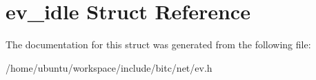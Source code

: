 \hypertarget{structev__idle}{\section{ev\-\_\-idle Struct Reference}
\label{structev__idle}
}


The documentation for this struct was generated from the following file\-:\begin{DoxyCompactItemize}
\item 
/home/ubuntu/workspace/include/bitc/net/ev.\-h\end{DoxyCompactItemize}
